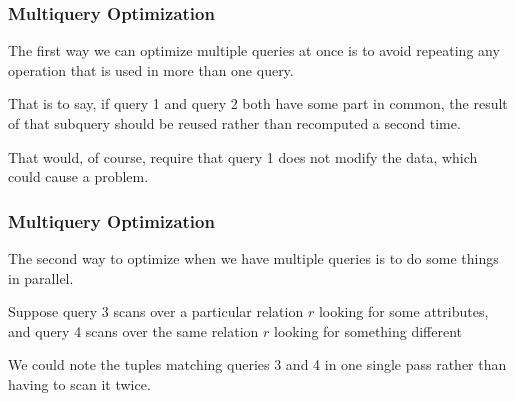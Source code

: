 \begin{frame}
\frametitle{Multiquery Optimization}

The first way we can optimize multiple queries at once is to avoid repeating any operation that is used in more than one query. 

That is to say, if query 1 and query 2 both have some part in common, the result of that subquery should be reused rather than recomputed a second time. 

That would, of course, require that query 1 does not modify the data, which could cause a problem.

\end{frame}

\begin{frame}
\frametitle{Multiquery Optimization}

The second way to optimize when we have multiple queries is to do some things in parallel. 

Suppose query 3 scans over a particular relation $r$ looking for some attributes, and query 4 scans over the same relation $r$ looking for something different

We could note the tuples matching queries 3 and 4 in one single pass rather than having to scan it twice.



\end{frame}






